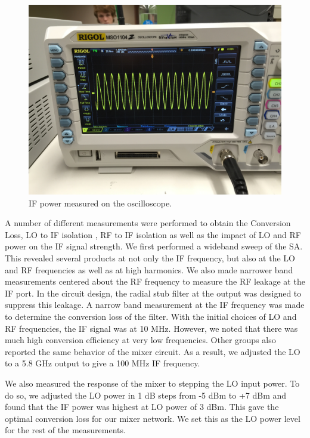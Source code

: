 \documentclass[twocolumn, aps, floatfix]{revtex4-1}
\begin{document}
\begin{figure}[!htbp]
    \includegraphics[scale=0.06]{oscilloscope.jpeg}
    \caption{IF power measured on the oscilloscope.}
    \label{fig:oscilloscope}
\end{figure}

A number of different measurements were performed to obtain the Conversion Loss, LO to IF isolation , RF to IF isolation as well as the impact of LO and RF power on the IF signal strength. We first performed a wideband sweep of the SA. This revealed several products at not only the IF frequency, but also at the LO and RF frequencies as well as at high harmonics. We also made narrower band measurements centered about the RF frequency to measure the RF leakage at the IF port. In the circuit design, the radial stub filter at the output was designed to suppress this leakage. A narrow band measurement at the IF frequency was made to determine the conversion loss of the filter. With the initial choices of LO and RF frequencies, the IF signal was at 10 MHz. However, we noted that there was much high conversion efficiency at very low frequencies. Other groups also reported the same behavior of the mixer circuit. As a result, we adjusted the LO to a 5.8 GHz output to give a 100 MHz IF frequency. 

We also measured the response of the mixer to stepping the LO input power. To do so, we adjusted the LO power in 1 dB steps from -5 dBm to +7 dBm  and found that the IF power was highest at LO power of 3 dBm. This gave the optimal conversion loss for our mixer network. We set this as the LO power level for the rest of the measurements.
\end{document}

